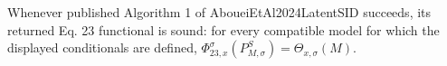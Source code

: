 Whenever published Algorithm 1 of AboueiEtAl2024LatentSID succeeds, its returned Eq. 23 functional is sound: for every compatible model for which the displayed conditionals are defined, \(\Phi_{23,x}^{\sigma}(P_{M,\sigma}^S)=\Theta_{x,\sigma}(M)\).